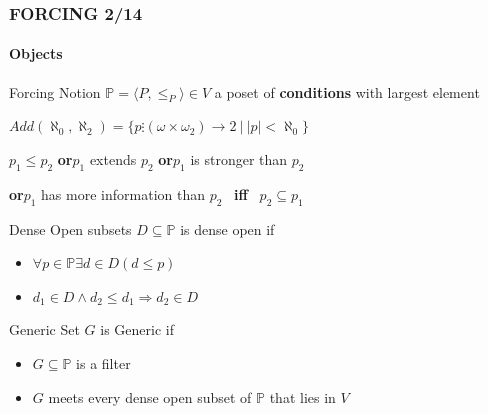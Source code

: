 \documentclass{beamer}
\begin{document}
\begin{frame}
\frametitle{FORCING \hspace{87mm}2/14}
\framesubtitle{Objects}
\begin{block}{Forcing Notion}
$\mathbb{P}= \langle P, \leq_P \rangle \in V$ a poset of \textbf{conditions} with largest element

\hspace{20mm}$Add(\aleph_0, \aleph_2)= \{p \vdots (\omega \times \omega_2) \longrightarrow 2 \ | \ |p| < \aleph_0\}$

$p_1 \leq p_2$ \quad \textbf{{\large or}}\quad $p_1$ extends $p_2$ \quad \textbf{{\large or}}\quad $p_1$ is stronger than $p_2$

\textbf{{\large or}}\quad $p_1$ has more information than $p_2$ \ \textbf{{\large iff}} \ $p_2 \subseteq p_1$
\end{block}
\vspace{-2mm}
\begin{block}{Dense Open subsets}
$D \subseteq \mathbb{P}$ is dense open if
\begin{itemize}
\item $\forall p \in \mathbb{P} \exists d \in D (d \leq p)$
\item $d_1 \in D \land d_2 \leq d_1 \Rightarrow d_2 \in D$
\end{itemize}
\end{block}
\vspace{-2mm}
\begin{block}{Generic Set}
$G$ is Generic if
\begin{itemize}
	\item $G \subseteq \mathbb{P}$ is a filter
	\item $G$ meets every dense open subset of $\mathbb{P}$ that lies in $V$
\end{itemize}
\end{block}
\end{frame}
\end{document}
